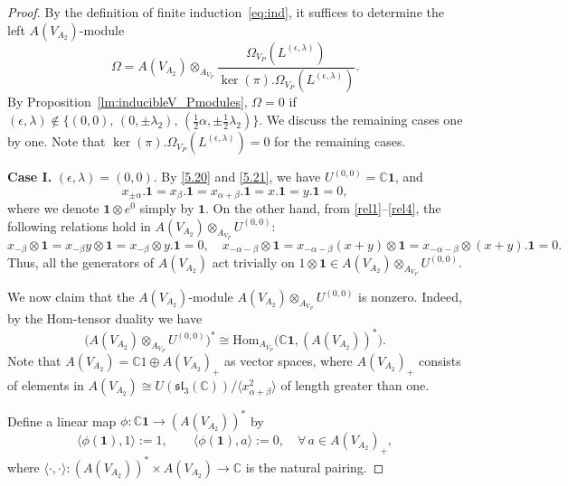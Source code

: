 \documentclass[12pt,a4paper,reqno]{amsart}
\numberwithin{equation}{section}
\numberwithin{equation}{section}
\theoremstyle{definition}
\def \C {\mathbb{C}}
\def \vac {\mathbf{1}}
\def \Hom {\mathrm{Hom}}
\def\sl{\mathfrak{sl}}
\begin{document}
		\begin{proof}
			By the definition of finite induction~\eqref{eq:ind}, it suffices to determine the left $A(V_{A_2})$-module 
			\begin{equation}
				\Omega = A(V_{A_2}) \otimes_{A_{V_P}} \frac{\Omega_{V_P}(L^{(\epsilon,\lambda)})}
				{\ker(\pi).\Omega_{V_P}(L^{(\epsilon,\lambda)})}.
			\end{equation}
			By Proposition~\ref{lm:inducibleV_Pmodules}, $\Omega = 0$ if 
			$(\epsilon,\lambda)\notin \{(0,0),\,(0,\pm \lambda_2),\,(\frac{1}{2}\alpha,\pm \frac{1}{2}\lambda_2)\}$.
			We discuss the remaining cases one by one. Note that $	{\ker(\pi).\Omega_{V_P}(L^{(\epsilon,\lambda)})}=0$ for the remaining cases. 
			
			
			
			\noindent\textbf{Case I.} $(\epsilon, \lambda) = (0,0)$. 
			By \eqref{5.20} and \eqref{5.21}, we have $U^{(0,0)} = \C \vac$, and
			\[
			x_{\pm \alpha}.\vac = x_{\beta}.\vac = x_{\alpha+\beta}.\vac = x.\vac = y.\vac = 0,
			\]
			where we denote $\vac \otimes e^0$ simply by $\vac$. 
			On the other hand, from \eqref{rel1}--\eqref{rel4}, the following relations hold in 
			$A(V_{A_2}) \otimes_{A_{V_P}} U^{(0,0)}$:
			\[
			x_{-\beta} \otimes \vac 
			= x_{-\beta}y \otimes \vac 
			= x_{-\beta} \otimes y.\vac = 0, 
			\quad 
			x_{-\alpha-\beta} \otimes \vac 
			= x_{-\alpha-\beta}(x+y) \otimes \vac 
			= x_{-\alpha-\beta} \otimes (x+y).\vac = 0.
			\]
			Thus, all the generators of $A(V_{A_2})$ act trivially on $1 \otimes \vac 
			\in A(V_{A_2}) \otimes_{A_{V_P}} U^{(0,0)}$.
			
			We now claim that the $A(V_{A_2})$-module $A(V_{A_2}) \otimes_{A_{V_P}} U^{(0,0)}$ is nonzero. 
			Indeed, by the Hom-tensor duality we have
			\[
			\big(A(V_{A_2}) \otimes_{A_{V_P}} U^{(0,0)}\big)^{\!*}
			\cong 
			\Hom_{A_{V_P}}\!\big(\C \vac, (A(V_{A_2}))^{\!*}\big).
			\]
			Note that $A(V_{A_2}) = \C 1 \oplus A(V_{A_2})_+$ as vector spaces, 
			where $A(V_{A_2})_+$ consists of elements in 
			$A(V_{A_2}) \cong U(\sl_3(\C))/\langle x_{\alpha+\beta}^2\rangle$ of length greater than one.
			
			
			Define a linear map 
			$\phi : \C \vac \to (A(V_{A_2}))^{\!*}$ by
			\begin{equation}\label{eq:phiforU00}
				\langle \phi(\vac), 1 \rangle := 1,
				\qquad
				\langle \phi(\vac), a \rangle := 0, 
				\quad \forall\, a \in A(V_{A_2})_+,
			\end{equation}
			where 
			$\langle \cdot, \cdot \rangle : (A(V_{A_2}))^{\!*} \times A(V_{A_2}) \to \C$ 
			is the natural pairing.
			

\end{proof}
\end{document}

